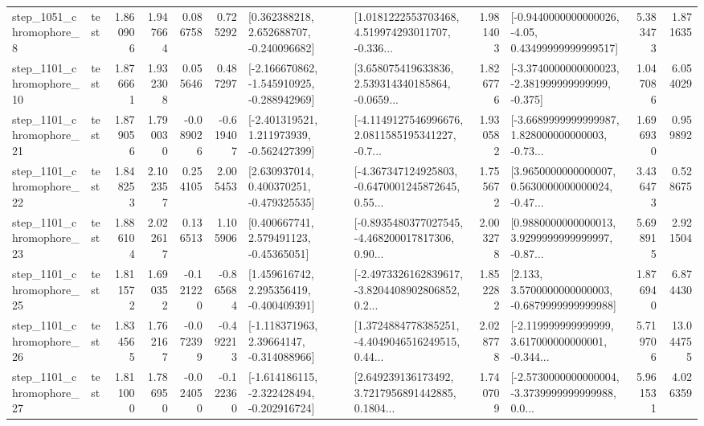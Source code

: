\begin{tabular}{llrrrrllrlrr}
  step\_1051\_chromophore\_8 &      test &      1.860906 &    1.947664 &      0.086758 &  0.725292 &    [0.362388218, 2.652688707, -0.240096682] &  [1.0181222553703468, 4.519974293011707, -0.336... &       1.981403 &  [-0.9440000000000026, -4.05, 0.43499999999999517] &            5.383473 &          1.871635 \\
 step\_1101\_chromophore\_10 &      test &      1.876661 &    1.932308 &      0.055646 &  0.487297 &  [-2.166670862, -1.545910925, -0.288942969] &  [3.658075419633836, 2.539314340185864, -0.0659... &       1.826776 &  [-3.3740000000000023, -2.381999999999999, -0.375] &            1.047086 &          6.054029 \\
 step\_1101\_chromophore\_21 &      test &      1.879056 &    1.790030 &     -0.089026 & -0.619407 &   [-2.401319521, 1.211973939, -0.562427399] &  [-4.1149127546996676, 2.0811585195341227, -0.7... &       1.930582 &  [-3.6689999999999987, 1.828000000000003, -0.73... &            1.696930 &          0.959892 \\
 step\_1101\_chromophore\_22 &      test &      1.848253 &    2.102357 &      0.254105 &  2.005453 &    [2.630937014, 0.400370251, -0.479325535] &  [-4.367347124925803, -0.6470001245872645, 0.55... &       1.755672 &  [3.9650000000000007, 0.5630000000000024, -0.47... &            3.436473 &          0.528675 \\
 step\_1101\_chromophore\_23 &      test &      1.886104 &    2.022617 &      0.136513 &  1.105906 &     [0.400667741, 2.579491123, -0.45365051] &  [-0.8935480377027545, -4.468200017817306, 0.90... &       2.003278 &  [0.9880000000000013, 3.9299999999999997, -0.87... &            5.698915 &          2.921504 \\
 step\_1101\_chromophore\_25 &      test &      1.811572 &    1.690352 &     -0.121220 & -0.865684 &    [1.459616742, 2.295356419, -0.400409391] &  [-2.4973326162839617, -3.8204408902806852, 0.2... &       1.852282 &   [2.133, 3.5700000000000003, -0.6879999999999988] &            1.876940 &          6.874430 \\
 step\_1101\_chromophore\_26 &      test &      1.834565 &    1.762167 &     -0.072399 & -0.492213 &    [-1.118371963, 2.39664147, -0.314088966] &  [1.3724884778385251, -4.4049046516249515, 0.44... &       2.028778 &  [-2.119999999999999, 3.617000000000001, -0.344... &            5.719706 &         13.044755 \\
 step\_1101\_chromophore\_27 &      test &      1.811000 &    1.786950 &     -0.024050 & -0.122360 &  [-1.614186115, -2.322428494, -0.202916724] &  [2.649239136173492, 3.7217956891442885, 0.1804... &       1.740709 &  [-2.5730000000000004, -3.3739999999999988, 0.0... &            5.961531 &          4.026359 \\

\end{tabular}
